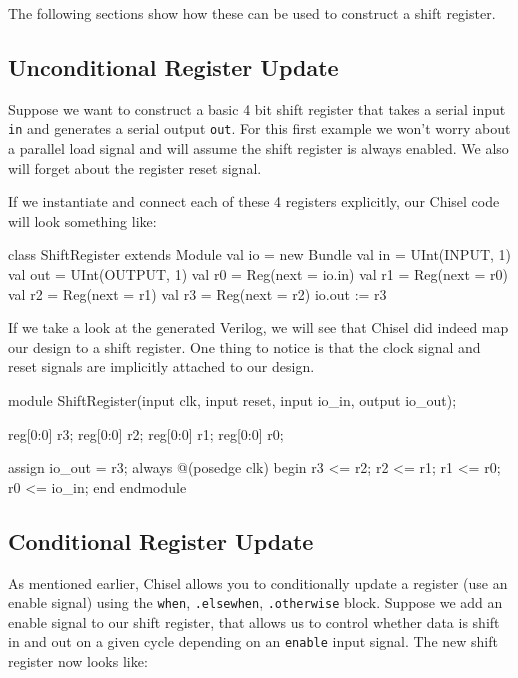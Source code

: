 \documentclass[twocolumn, 10pt]{article}
\begin{document}
The following sections show how these can be used to construct a shift register.

\subsection{Unconditional Register Update}

Suppose we want to construct a basic 4 bit shift register that takes a serial input \verb+in+ and generates a serial output \verb+out+. For this first example we won't worry about a parallel load signal and will assume the shift register is always enabled. We also will forget about the register reset signal.

If we instantiate and connect each of these 4 registers explicitly, our Chisel code will look something like:

\begin{scala}
class ShiftRegister extends Module {
  val io = new Bundle {
    val in  = UInt(INPUT, 1)
    val out = UInt(OUTPUT, 1)
  }
  val r0 = Reg(next = io.in)
  val r1 = Reg(next = r0)
  val r2 = Reg(next = r1)
  val r3 = Reg(next = r2)
  io.out := r3
}
\end{scala}

If we take a look at the generated Verilog, we will see that Chisel did indeed map our design to a shift register. One thing to notice is that the clock signal and reset signals are implicitly attached to our design.

\begin{bash}
module ShiftRegister(input clk, input reset,
    input  io_in,
    output io_out);

  reg[0:0] r3;
  reg[0:0] r2;
  reg[0:0] r1;
  reg[0:0] r0;

  assign io_out = r3;
  always @(posedge clk) begin
    r3 <= r2;
    r2 <= r1;
    r1 <= r0;
    r0 <= io_in;
  end
endmodule
\end{bash}

\subsection{Conditional Register Update}

As mentioned earlier, Chisel allows you to conditionally update a register (use an enable signal) using the \verb+when+, \verb+.elsewhen+, \verb+.otherwise+ block. Suppose we add an enable signal to our shift register, that allows us to control whether data is shift in and out on a given cycle depending on an \verb+enable+ input signal. The new shift register now looks like:
\end{document}
